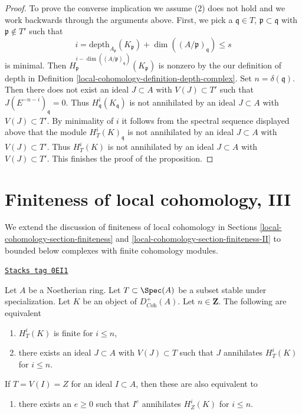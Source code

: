 \begin{proof}
\medskip\noindent
To prove the converse implication we assume (2) does not hold
and we work backwards through the arguments above. First, we pick a
$\mathfrak q \in T$, $\mathfrak p \subset \mathfrak q$
with $\mathfrak p \not \in T'$ such that
$$
i = \text{depth}_{A_\mathfrak p}(K_\mathfrak p) +
\dim((A/\mathfrak p)_\mathfrak q) \leq s
$$
is minimal. Then
$H^{i - \dim((A/\mathfrak p)_\mathfrak q)}_\mathfrak p(K_\mathfrak p)$
is nonzero by the our definition of depth in
Definition \ref{local-cohomology-definition-depth-complex}.
Set $n = \delta(\mathfrak q)$. Then
there does not exist an ideal $J \subset A$ with $V(J) \subset T'$
such that $J(E^{-n - i})_\mathfrak q = 0$.
Thus $H^i_\mathfrak q(K_\mathfrak q)$ is not
annihilated by an ideal $J \subset A$ with $V(J) \subset T'$.
By minimality of $i$ it follows from the spectral sequence displayed above
that the module $H^i_T(K)_\mathfrak q$
is not annihilated by an ideal $J \subset A$
with $V(J) \subset T'$. Thus $H^i_T(K)$
is not annihilated by an ideal $J \subset A$
with $V(J) \subset T'$. This finishes the proof of the proposition.
\end{proof}

\section{Finiteness of local cohomology, III}
\label{local-cohomology-section-finiteness-III}
We extend the discussion of finiteness of local cohomology
in Sections \ref{local-cohomology-section-finiteness} and \ref{local-cohomology-section-finiteness-II}
to bounded below complexes with finite cohomology modules.

\begin{lemma}
\label{local-cohomology-lemma-check-finiteness-local-cohomology-by-annihilator-complex}
\href{https://stacks.math.columbia.edu/tag/0EI1}{\texttt{Stacks tag 0EI1}}

Let $A$ be a Noetherian ring. Let $T \subset \Spec(A)$ be a subset stable
under specialization. Let $K$ be an object of $D_{\textit{Coh}}^+(A)$.
Let $n \in \mathbf{Z}$. The following are equivalent
\begin{enumerate}
\item $H^i_T(K)$ is finite for $i \leq n$,
\item there exists an ideal $J \subset A$ with $V(J) \subset T$
such that $J$ annihilates $H^i_T(K)$ for $i \leq n$.
\end{enumerate}
If $T = V(I) = Z$ for an ideal $I \subset A$, then these are also
equivalent to
\begin{enumerate}
\item[(3)] there exists an $e \geq 0$ such that $I^e$ annihilates
$H^i_Z(K)$ for $i \leq n$.
\end{enumerate}
\end{lemma}


